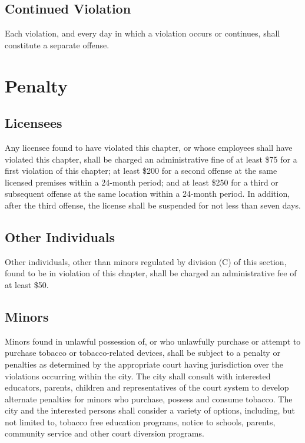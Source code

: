 \subsection{Continued Violation}
Each violation, and every day in which a violation occurs or continues, shall constitute a separate offense.

\setcounter{section}{98}
\section{Penalty}
\subsection{Licensees}
Any licensee found to have violated this chapter, or whose employees shall have violated this chapter, shall be charged an administrative fine of at least \$75 for a first violation of this chapter; at least \$200 for a second offense at the same licensed premises within a 24-month period; and at least \$250 for a third or subsequent offense at the same location within a 24-month period.  In addition, after the third offense, the license shall be suspended for not less than seven days.
\subsection{Other Individuals}
Other individuals, other than minors regulated by division (C) of this section, found to be in violation of this chapter, shall be charged an administrative fee of at least \$50.
\subsection{Minors}
Minors found in unlawful possession of, or who unlawfully purchase or attempt to purchase tobacco or tobacco-related devices, shall be subject to a penalty or penalties as determined by the appropriate court having jurisdiction over the violations occurring within the city.  The city shall consult with interested educators, parents, children and representatives of the court system to develop alternate penalties for minors who purchase, possess and consume tobacco.  The city and the interested persons shall consider a variety of options, including, but not limited to, tobacco free education programs, notice to schools, parents, community service and other court diversion programs.
